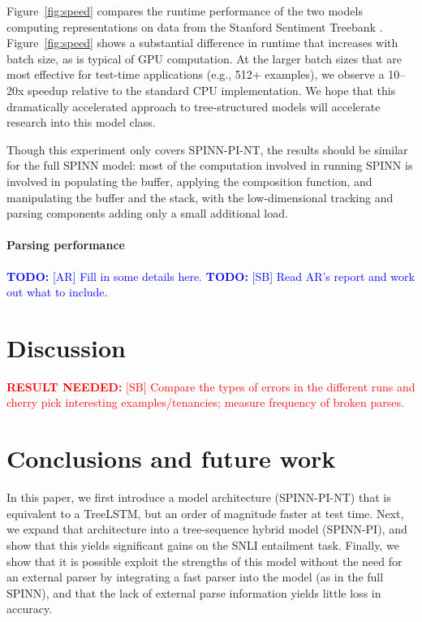 \documentclass[11pt]{article}
\newcommand\todo[1]{\textcolor{blue}{\textbf{TODO:} #1}}
\newcommand\result[1]{\textcolor{red}{\textbf{RESULT NEEDED:} #1}}
\begin{document}
Figure~\ref{fig:speed} compares the runtime performance of the two models computing representations on data from the Stanford Sentiment Treebank \citep{socher2013recursive}. Figure~\ref{fig:speed} shows a substantial difference in runtime that increases with batch size, as is typical of GPU computation. At the larger batch sizes that are most effective for test-time applications (e.g., 512+ examples), we observe a 10--20x speedup relative to the standard CPU implementation. We hope that this dramatically accelerated approach to tree-structured models will accelerate research into this model class.

Though this experiment only covers SPINN-PI-NT, the results should be similar for the full SPINN model: most of the computation involved in running SPINN is involved in populating the buffer, applying the composition function, and manipulating the buffer and the stack, with the low-dimensional tracking and parsing components adding only a small additional load.

\paragraph{Parsing performance}

\todo{[AR] Fill in some details here.}
\todo{[SB] Read AR's report and work out what to include.}

\section{Discussion}

\result{[SB] Compare the types of errors in the different runs and cherry pick interesting examples/tenancies; measure frequency of broken parses.}

\vspace{10em}

\section{Conclusions and future work}

In this paper, we first introduce a model architecture (SPINN-PI-NT) that is equivalent to a TreeLSTM, but an order of magnitude faster at test time. Next, we expand that architecture into a tree-sequence hybrid model (SPINN-PI), and show that this yields significant gains on the SNLI entailment task. Finally, we show that it is possible exploit the strengths of this model without the need for an external parser by integrating a fast parser into the model (as in the full SPINN), and that the lack of external parse information yields little loss in accuracy.
\end{document}
